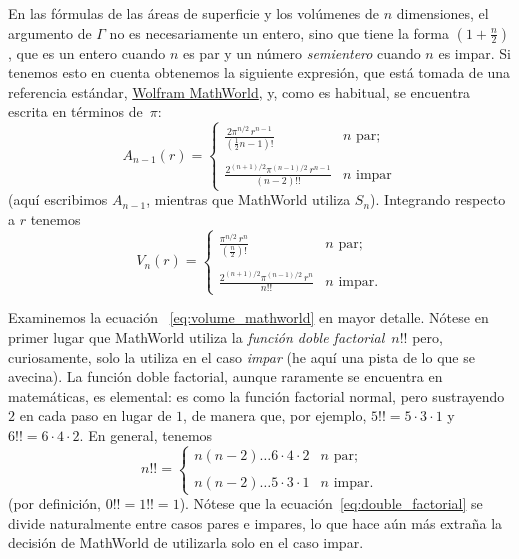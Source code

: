 En las fórmulas de las áreas de superficie y los volúmenes de $n$ dimensiones, el argumento de $\Gamma$ no es necesariamente un entero, sino que tiene la forma $\left(1 + \frac{n}{2}\right)$, que es un entero cuando $n$ es par y un número \emph{semientero} cuando $n$ es impar. Si tenemos esto en cuenta obtenemos la siguiente expresión, que está tomada de una referencia estándar, \href{http://mathworld.wolfram.com/Hypersphere.html}{Wolfram MathWorld}, y, como es habitual, se encuentra escrita en términos de~$\pi$:
\begin{equation}
\label{eq:surface_area_mathworld}
A_{n-1}(r) = \begin{cases}
\displaystyle \frac{2\pi^{n/2}\,r^{n-1}}{(\frac{1}{2}n - 1)!} & n \text{ par}; \\ \\
 \displaystyle \frac{2^{(n+1)/2}\pi^{(n-1)/2}\,r^{n-1}}{(n-2)!!} & n \text{ impar}
\end{cases}
\end{equation}
(aquí escribimos $A_{n-1}$, mientras que MathWorld utiliza $S_n$). Integrando respecto a $r$ tenemos
\begin{equation}
\label{eq:volume_mathworld}
V_n(r) = \begin{cases}
\displaystyle \frac{\pi^{n/2}\,r^n}{(\frac{n}{2})!} & n \text{ par}; \\ \\
\displaystyle \frac{2^{(n+1)/2}\pi^{(n-1)/2}\,r^n}{n!!} & n \text{ impar}.
\end{cases}
\end{equation}

Examinemos la ecuación ~\eqref{eq:volume_mathworld} en mayor detalle. Nótese en primer lugar que MathWorld utiliza la \emph{función doble factorial}~$n!!$ pero, curiosamente, solo la utiliza en el caso \emph{impar} (he aquí una pista de lo que se avecina). La función doble factorial, aunque raramente se encuentra en matemáticas, es elemental: es como la función factorial normal, pero sustrayendo $2$ en cada paso en lugar de $1$, de manera que, por ejemplo, $5!! = 5 \cdot 3 \cdot 1$ y $6!! = 6 \cdot 4 \cdot 2$. En general, tenemos
\begin{equation}
\label{eq:double_factorial}
n!! = \begin{cases}
n(n-2)\ldots6\cdot4\cdot2 & n \text{ par}; \\ \\
n(n-2)\ldots5\cdot3\cdot1 & n \text{ impar}.
\end{cases}
\end{equation}
(por definición, $0!! = 1!! = 1$). Nótese que la ecuación~\eqref{eq:double_factorial} se divide naturalmente entre casos pares e impares, lo que hace aún más extraña la decisión de MathWorld de utilizarla solo en el caso impar.

